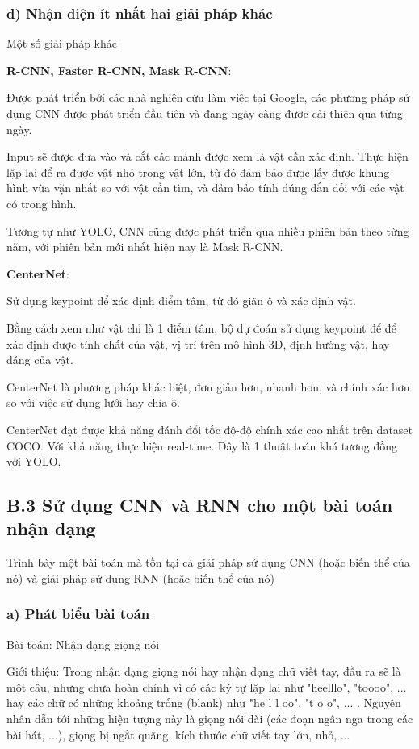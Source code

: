\documentclass{article}
\begin{document}
	\subsubsection{d) Nhận diện ít nhất hai giải pháp khác}
	Một số giải pháp khác
	
	\textbf{R-CNN, Faster R-CNN, Mask R-CNN}:
	
	Được phát triển bởi các nhà nghiên cứu làm việc tại Google, các phương pháp sử dụng CNN được phát triển đầu tiên và đang ngày càng được cải thiện qua từng ngày.

	Input sẽ được đưa vào và cắt các mảnh được xem là vật cần xác định. Thực hiện lặp lại để ra được vật nhỏ trong vật lớn, từ đó đảm bảo được lấy được khung hình vừa vặn nhất so với vật cần tìm, và đảm bảo tính đúng đắn đối với các vật có trong hình.

	Tương tự như YOLO, CNN cũng được phát triển qua nhiều phiên bản theo từng năm, với phiên bản mới nhất hiện nay là Mask R-CNN.

	\textbf{CenterNet}:
	
	Sử dụng keypoint để xác định điểm tâm, từ đó giãn ô và xác định vật.

	Bằng cách xem như vật chỉ là 1 điểm tâm, bộ dự đoán sử dụng keypoint để để xác định được tính chất của vật, vị trí trên mô hình 3D, định hướng vật, hay dáng của vật.

	CenterNet là phương pháp khác biệt, đơn giản hơn, nhanh hơn, và chính xác hơn so với việc sử dụng lưới hay chia ô. 

	CenterNet đạt được khả năng đánh đổi tốc độ-độ chính xác cao nhất trên dataset COCO.  Với khả năng thực hiện real-time. Đây là 1 thuật toán khá tương đồng với YOLO.
	\subsection{B.3 Sử dụng CNN và RNN cho một bài toán nhận dạng} \qquad Trình bày một bài toán mà tồn tại cả giải pháp sử dụng CNN (hoặc biến thể của nó) và giải pháp sử dụng RNN (hoặc biến thể của nó)
	
	\subsubsection{a) Phát biểu bài toán}
	
	\qquad Bài toán: Nhận dạng giọng nói
	
	Giới thiệu: Trong nhận dạng giọng nói hay nhận dạng chữ viết tay, đầu ra sẽ là một câu, nhưng chưa hoàn chỉnh vì có các ký tự lặp lại như "heelllo", "toooo", ... hay các chữ có những khoảng trống (blank) như "he l l oo", "t o o", ... . Nguyên nhân dẫn tới những hiện tượng này là giọng nói dài (các đoạn ngân nga trong các bài hát, ...), giọng bị ngắt quãng, kích thước chữ viết tay lớn, nhỏ, ...
	
\end{document}
